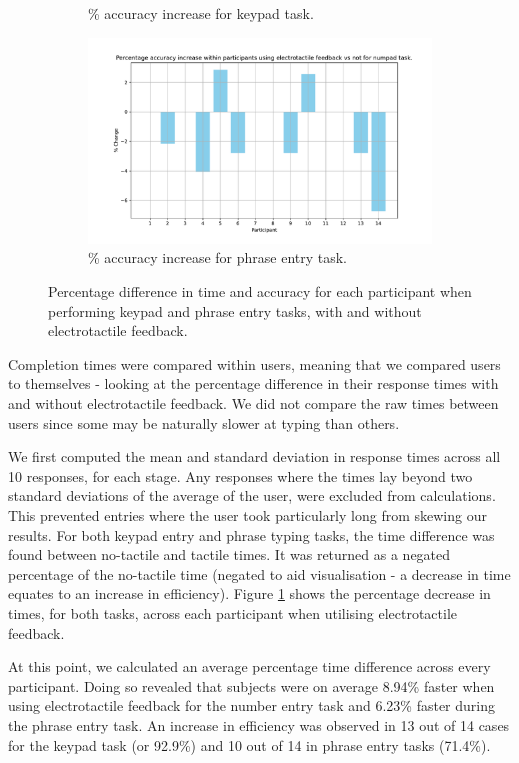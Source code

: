 \documentclass{mpaper}
\begin{document}
\begin{figure}
\begin{subfigure}{0.45\textwidth}
        \caption{\% accuracy increase for keypad task.}
    \end{subfigure} \hfill
    \begin{subfigure}{0.45\textwidth}
        \includegraphics[width=\textwidth, page=2]{images/combinepdf.pdf}
        \caption{\% accuracy increase for phrase entry task.}
    \end{subfigure} \hfill
    \caption{Percentage difference in time and accuracy for each participant when performing keypad and phrase entry tasks, with and without electrotactile feedback.}
    \label{fig:percentage-changes}
\end{figure}

Completion times were compared within users, meaning that we compared users to themselves - looking at the percentage difference in their response times with and without electrotactile feedback. We did not compare the raw times between users since some may be naturally slower at typing than others.

We first computed the mean and standard deviation in response times across all 10 responses, for each stage. Any responses where the times lay beyond two standard deviations of the average of the user, were excluded from calculations. This prevented entries where the user took particularly long from skewing our results. For both keypad entry and phrase typing tasks, the time difference was found between no-tactile and tactile times. It was returned as a negated percentage of the no-tactile time (negated to aid visualisation - a decrease in time equates to an increase in efficiency). Figure \ref{fig:percentage-changes} shows the percentage decrease in times, for both tasks, across each participant when utilising electrotactile feedback.

At this point, we calculated an average percentage time difference across every participant. Doing so revealed that subjects were on average 8.94\% faster when using electrotactile feedback for the number entry task and 6.23\% faster during the phrase entry task. An increase in efficiency was observed in 13 out of 14 cases for the keypad task (or 92.9\%) and 10 out of 14 in phrase entry tasks (71.4\%).
\end{document}
